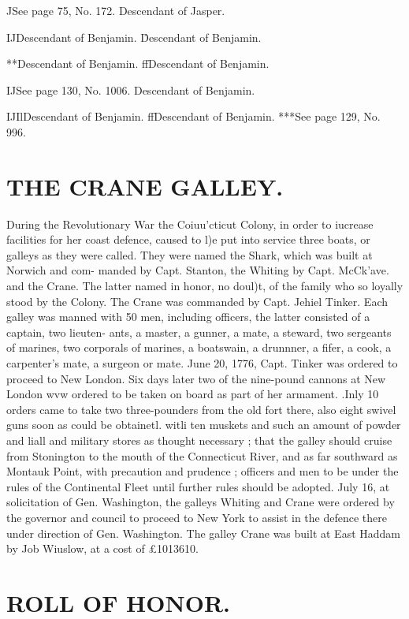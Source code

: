 \documentclass{book}
\begin{document}
JSee page 75, No. 172. Descendant of Jasper. 

IJDescendant of Benjamin. \^Descendant of Benjamin. 

**Descendant of Benjamin. ffDescendant of Benjamin. 

IJSee page 130, No. 1006. Descendant of Benjamin. 

IJIlDescendant of Benjamin. ffDescendant of Benjamin. 
***See page 129, No. 996. 



\chapter{THE CRANE GALLEY.}


During the Revolutionary War the Coiuu'cticut Colony, in 
order to iucrease facilities for her coast defence, caused to l)e 
put into service three boats, or galleys as they were called. They 
were named the Shark, which was built at Norwich and com- 
manded by Capt. Stanton, the Whiting by Capt. McCk'ave. and 
the Crane. The latter named in honor, no doul)t, of the family 
who so loyally stood by the Colony. The Crane was commanded 
by Capt. Jehiel Tinker. Each galley was manned with 50 men, 
including officers, the latter consisted of a captain, two lieuten- 
ants, a master, a gunner, a mate, a steward, two sergeants of 
marines, two corporals of marines, a boatswain, a drunnner, a 
fifer, a cook, a carpenter's mate, a surgeon or mate. June 20, 
1776, Capt. Tinker was ordered to proceed to New London. Six 
days later two of the nine-pound cannons at New London wvw 
ordered to be taken on board as part of her armament. .Inly 10 
orders came to take two three-pounders from the old fort there, 
also eight swivel guns soon as could be obtainetl. witli ten 
muskets and such an amount of powder and liall and military 
stores as thought necessary ; that the galley should cruise from 
Stonington to the mouth of the Connecticut River, and as far 
southward as Montauk Point, with precaution and prudence ; 
officers and men to be under the rules of the Continental Fleet 
until further rules should be adopted. July 16, at solicitation of 
Gen. Washington, the galleys Whiting and Crane were ordered 
by the governor and council to proceed to New York to assist in 
the defence there under direction of Gen. Washington. The 
galley Crane was built at East Haddam by Job Wiuslow, at a 
cost of £1013610. 



\chapter{ROLL OF HONOR.}
\end{document}
